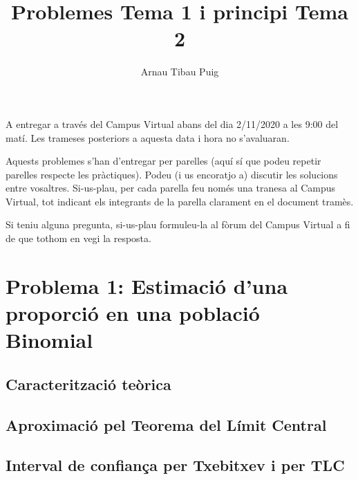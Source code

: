\documentclass[10pt,a4paper]{article}
\author{Arnau Tibau Puig}
\title{Problemes Tema 1 i principi Tema 2}
\begin{document}
\maketitle

A entregar a través del Campus Virtual abans del dia 2/11/2020 a les 9:00 del matí. Les trameses posteriors a aquesta data i hora no s’avaluaran.

Aquests problemes s'han d'entregar per parelles (aquí sí que podeu repetir parelles respecte les pràctiques). Podeu (i us encoratjo a) discutir les solucions entre vosaltres. Si-us-plau, per cada parella feu només una tranesa al Campus Virtual, tot indicant els integrants de la parella clarament en el document tramès.

Si teniu alguna pregunta, si-us-plau formuleu-la al fòrum del Campus Virtual a fi de que tothom en vegi la resposta.

 
\section{Problema 1: Estimació d'una proporció en una població Binomial}

 \subsection{Caracterització teòrica}

 \subsection{Aproximació pel Teorema del Límit Central}
 
  \subsection{Interval de confiança per Txebitxev i per TLC}
  
\end{document}
